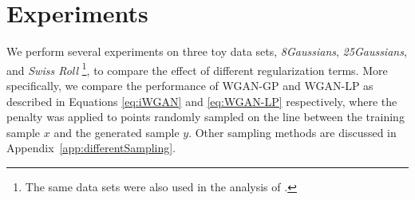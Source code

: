 \documentclass{article} %
\newcommand{\RR}[1][]{\mathbb{R}^{#1}}
\newcommand{\af}[1]{\textcolor{blue}{#1}}
\newcommand{\hp}[1]{\textcolor{red}{#1}}
\newtheorem{remark}{Remark}
\begin{document}





\section{Experiments}\label{sec:experiments}
We perform several experiments on  three toy data sets, \emph{8Gaussians}, \emph{25Gaussians}, and \emph{Swiss Roll}  \footnote{The same data sets were also used in the analysis of \citet{iWGAN}.},
to compare the effect of different regularization terms. More specifically, we compare the performance of WGAN-GP and WGAN-LP as described in Equations \eqref{eq:iWGAN} and \eqref{eq:WGAN-LP} respectively, where the penalty was applied to points randomly sampled on the line between the training sample $x$ and the generated sample $y$. Other sampling methods are discussed in Appendix~\ref{app:differentSampling}.


\end{document}
